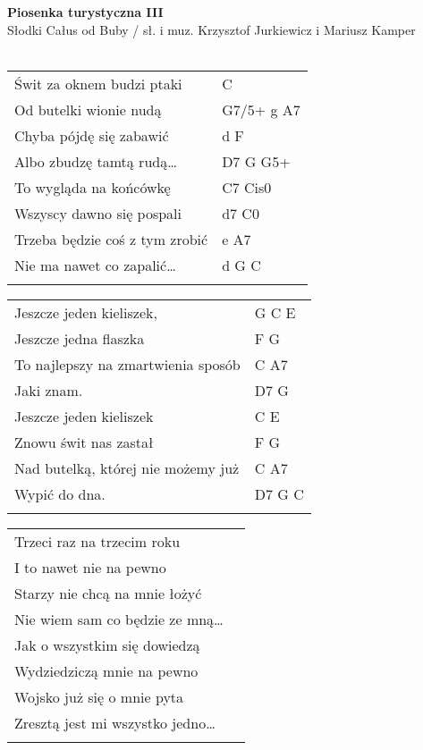 \documentclass[a5paper]{article}
\begin{document}


\noindent
\fontsize{12pt}{15pt}\selectfont
\textbf{Piosenka turystyczna III} \\
\fontsize{8pt}{10pt}\selectfont
Słodki Całus od Buby / sł. i muz. Krzysztof Jurkiewicz i Mariusz Kamper \\ \\
\fontsize{10pt}{12pt}\selectfont
{}
\begin{tabular}{@{}p{8.00cm}p{3cm}@{}}
\noindent
Świt za oknem budzi ptaki & C \\
Od butelki wionie nudą & G7/5+ g A7 \\
Chyba pójdę się zabawić & d F \\
Albo zbudzę tamtą rudą… & D7 G G5+ \\
To wygląda na końcówkę & C7 Cis0 \\
Wszyscy dawno się pospali & d7 C0 \\
Trzeba będzie coś z tym zrobić & e A7 \\
Nie ma nawet co zapalić… & d G C \\ \\
\end{tabular}

\noindent
\begin{tabular}{@{}p{7.00cm}p{3cm}@{}}
Jeszcze jeden kieliszek, & G C E \\
Jeszcze jedna flaszka & F G \\
To najlepszy na zmartwienia sposób & C A7 \\
Jaki znam. & D7 G \\
Jeszcze jeden kieliszek & C E \\
Znowu świt nas zastał & F G \\
Nad butelką, której nie możemy już & C A7 \\
Wypić do dna. & D7 G C \\ \\
\end{tabular}

\noindent
\begin{tabular}{@{}p{7.00cm}p{3cm}@{}}
Trzeci raz na trzecim roku \\
I to nawet nie na pewno \\
Starzy nie chcą na mnie łożyć\\
Nie wiem sam co będzie ze mną…\\
Jak o wszystkim się dowiedzą\\
Wydziedziczą mnie na pewno\\
Wojsko już się o mnie pyta\\
Zresztą jest mi wszystko jedno…\\ \\
\end{tabular}
\end{document}
